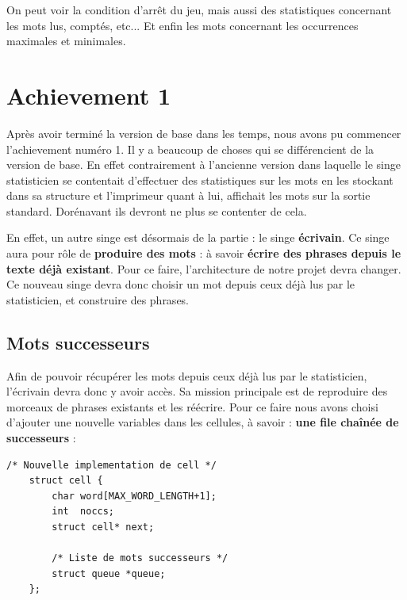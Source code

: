 \documentclass{article}
\begin{document}
On peut voir la condition d'arrêt du jeu, mais aussi des statistiques concernant les mots lus, comptés, etc... Et enfin les mots concernant les occurrences maximales et minimales.


\newpage
\section{Achievement 1}
\label{sct:achiev1}

Après avoir terminé la version de base dans les temps, nous avons pu commencer l'achievement numéro 1. Il y a beaucoup de choses qui se différencient de la version de base. En effet contrairement à l'ancienne version dans laquelle le singe statisticien se contentait d'effectuer des statistiques sur les mots en les stockant dans sa structure et l'imprimeur quant à lui, affichait les mots sur la sortie standard. Dorénavant ils devront ne plus se contenter de cela.

En effet, un autre singe est désormais de la partie : le singe \textbf{écrivain}. Ce singe aura pour rôle de \textbf{produire des mots} : à savoir \textbf{écrire des phrases depuis le texte déjà existant}. Pour ce faire, l'architecture de notre projet devra changer. Ce nouveau singe devra donc choisir un mot depuis ceux déjà lus par le statisticien, et construire des phrases.

\subsection{Mots successeurs}
\label{subsct:mot_successeurs}

Afin de pouvoir récupérer les mots depuis ceux déjà lus par le statisticien, l'écrivain devra donc y avoir accès. Sa mission principale est de reproduire des morceaux de phrases existants et les réécrire. Pour ce faire nous avons choisi d'ajouter une nouvelle variables dans les cellules, à savoir : \textbf{une file chaînée de successeurs} :
\begin{lstlisting}
/* Nouvelle implementation de cell */
    struct cell {
        char word[MAX_WORD_LENGTH+1];  
        int  noccs;              
        struct cell* next;
        
        /* Liste de mots successeurs */
        struct queue *queue;
    };
\end{lstlisting}
\label{lst:nouvelle_impl_cells}
\end{document}
